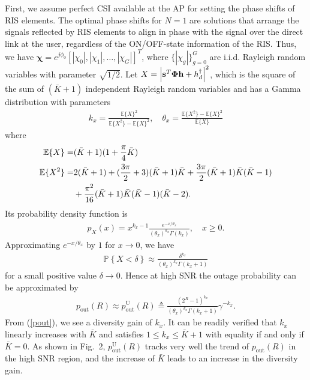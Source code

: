 \documentclass[draftclsnofoot,onecolumn,12pt]{IEEEtran}
\begin{document}
First, we assume perfect CSI available at the AP for setting the phase shifts of RIS elements. 
The optimal phase shifts for $N=1$ are solutions that 
arrange the signals reflected by RIS elements to align in phase with the signal over the direct link at the user, regardless of the ON/OFF-state information of the RIS. 
Thus, we have ${\bm \chi}=e^{j \phi_0 }\left[ |\chi_0|, |\chi_1|,\ldots,|\chi_G| \right]^T$, where $\{ |\chi_g| \}_{g=0}^G$ are i.i.d. Rayleigh random variables with parameter $\sqrt{1/2}$. 
Let $X=\left| {\bf s}^T {\bm \Phi} {{\bf h}} + {{h}}_d^\dagger \right|^2$, which is the square of the sum of $(\bar{K}+1)$ independent Rayleigh random variables and has a Gamma distribution with parameters 
\begin{align}
k_x = \frac{\mathbb{E}\{X\}^2}{ \mathbb{E}\{X^2\} - \mathbb{E}\{X\}^2 }, \quad \theta_x= \frac{ \mathbb{E}\{X^2\} - \mathbb{E}\{X\}^2 }{\mathbb{E}\{X\}}
\end{align}
where 
\begin{align}
\mathbb{E}\{X\}=&(\bar{K}+1) (1+ \frac{{\pi}}{4} \bar{K})\\
\mathbb{E}\{X^2\}=&2 (\bar{K}+1) +( \frac{3 {\pi}}{2} +3 ) (\bar{K}+1)\bar{K} + \frac{3 \pi}{2}(\bar{K}+1)\bar{K}(\bar{K}-1) \notag\\
&+ \frac{\pi^2}{16}(\bar{K}+1)\bar{K}(\bar{K}-1)(\bar{K}-2).
\end{align}	
Its probability density function is
\begin{align}
p_X(x) = x^{k_x-1} \frac{e^{ -x/\theta_x}}{ (\theta_x)^{k_x} \Gamma (k_x)}, \quad x\ge 0 .
\end{align}
Approximating $e^{ -x/\theta_x}$ by $1$ for $x\rightarrow 0 $, we have 
\begin{align}
\mathbb{P} \left\{ X < \delta\right\} \approx \frac{\delta^{k_x} }{ (\theta_x)^{k_x} \Gamma (k_x+1)}
\end{align}
for a small positive value  $\delta \rightarrow 0 $.  
Hence at high SNR the outage probability can be approximated by 
\begin{align}\label{pout}
p_\text{out} (R) \approx p_\text{out}^\text{U} (R) \triangleq\frac{(2^R -1)^{k_x}}{ (\theta_x)^{k_x} \Gamma (k_x+1)}{\gamma^{-k_x}} . 
\end{align}
From (\ref{pout}), we see a diversity gain of $k_x$. 
It can be readily verified that $k_x$ linearly increases  with $\bar{K}$ and satisfies $1 \le k_x\le \bar{K}+1$ with equality if and only if $\bar{K}=0$. 
As shown in Fig.~2, 
$p_\text{out}^\text{U} (R)$ tracks very well the trend of $p_\text{out} (R)$ in the high SNR region, and the increase of $\bar{K}$ leads to an increase in the diversity gain. 
\end{document}
